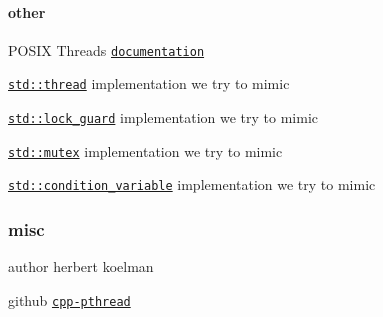\paragraph*{other}


\begin{DoxyItemize}
\item P\+O\+S\+I\+X Threads \href{http://pubs.opengroup.org/onlinepubs/007908799/xsh/threads.html}{\tt documentation}
\item \href{http://en.cppreference.com/w/cpp/thread/thread}{\tt std\+::thread} implementation we try to mimic
\item \href{http://en.cppreference.com/w/cpp/thread/lock_guard/lock_guard}{\tt std\+::lock\+\_\+guard} implementation we try to mimic
\item \href{http://en.cppreference.com/w/cpp/thread/mutex}{\tt std\+::mutex} implementation we try to mimic
\item \href{http://en.cppreference.com/w/cpp/thread/condition_variable}{\tt std\+::condition\+\_\+variable} implementation we try to mimic
\end{DoxyItemize}

\subsubsection*{misc}


\begin{DoxyItemize}
\item author herbert koelman
\item github \href{https://github.com/HerbertKoelman/cpp-pthread}{\tt cpp-\/pthread} 
\end{DoxyItemize}